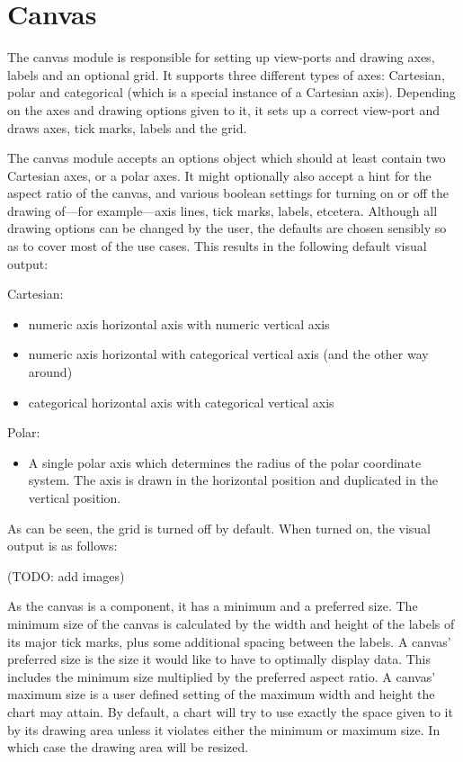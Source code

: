 \section{Canvas}
The canvas module is responsible for setting up view-ports and drawing axes, labels and an optional grid. It supports three different types of axes: Cartesian, polar and categorical (which is a special instance of a Cartesian axis). Depending on the axes and drawing options given to it, it sets up a correct view-port and draws axes, tick marks, labels and the grid. 

The canvas module accepts an options object which should at least contain two Cartesian axes, or a polar axes. It might optionally also accept a hint for the aspect ratio of the canvas, and various boolean settings for turning on or off the drawing of---for example---axis lines, tick marks, labels, etcetera. Although all drawing options can be changed by the user, the defaults are chosen sensibly so as to cover most of the use cases. This results in the following default visual output:

Cartesian:
\begin{itemize}
\item numeric axis horizontal axis with numeric vertical axis
\item numeric axis horizontal with categorical vertical axis (and the other way around)
\item categorical horizontal axis with categorical vertical axis
\end{itemize}

Polar:
\begin{itemize}
\item A single polar axis which determines the radius of the polar coordinate system. The axis is drawn in the horizontal position and duplicated in the vertical position.
\end{itemize}

As can be seen, the grid is turned off by default. When turned on, the visual output is as follows:

(TODO: add images)

As the canvas is a component, it has a minimum and a preferred size. The minimum size of the canvas is calculated by the width and height of the labels of its major tick marks, plus some additional spacing between the labels. A canvas' preferred size is the size it would like to have to optimally display data. This includes the minimum size multiplied by the preferred aspect ratio. A canvas' maximum size is a user defined setting of the maximum width and height the chart may attain. By default, a chart will try to use exactly the space given to it by its drawing area unless it violates either the minimum or maximum size. In which case the drawing area will be resized.

